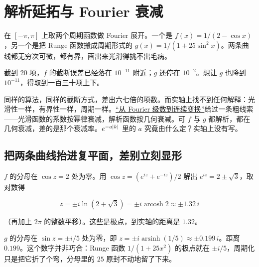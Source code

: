 \section{解析延拓与 Fourier 衰减}
\label{sec:08-Numerical-Analysis/09-Complex-Analysis-and-Residues/01}

在 \([-\pi,\pi]\) 上取两个周期函数做 Fourier 展开。一个是 \(f(x)=1/(2-\cos x)\)，另一个是把 Runge 函数搬成周期形式的 \(g(x)=1/(1+25\sin^2 x)\)。两条曲线都无穷次可微，都有界，画出来光滑得挑不出毛病。

截到 20 项，\(f\) 的截断误差已经落在 \(10^{-11}\) 附近；\(g\) 还停在 \(10^{-2}\)。想让 \(g\) 也降到 \(10^{-11}\)，得取到一百三十项上下。

同样的算法，同样的截断方式，差出六七倍的项数。而实轴上找不到任何解释：光滑性一样，有界性一样，周期一样。\hyperref[sec:08-Numerical-Analysis/08-Fourier-and-Spectral-Methods/01]{``从 Fourier 级数到连续变换''}给过一条粗线索——光滑函数的系数按幂律衰减，解析函数按几何衰减。可 \(f\) 与 \(g\) 都解析，都在几何衰减，差的是那个衰减率。\(e^{-a\left|k\right|}\) 里的 \(a\) 究竟由什么定？实轴上没有写。

\subsection{把两条曲线抬进复平面，差别立刻显形}

\(f\) 的分母在 \(\cos z=2\) 处为零。用 \(\cos z=(e^{iz}+e^{-iz})/2\) 解出 \(e^{iz}=2\pm\sqrt3\)，取对数得

\[
z=\pm i\ln(2+\sqrt3)=\pm i\operatorname{arcosh}2\approx\pm 1.32\,i
\]

（再加上 \(2\pi\) 的整数平移）。这些是极点，到实轴的距离是 \(1.32\)。

\(g\) 的分母在 \(\sin z=\pm i/5\) 处为零，即 \(z=\pm i\operatorname{arsinh}(1/5)\approx\pm 0.199\,i\)。距离 \(0.199\)。这个数字并非巧合：Runge 函数 \(1/(1+25x^2)\) 的极点就在 \(\pm i/5\)，周期化只是把它折了个弯，分母里的 \(25\) 原封不动地留了下来。

